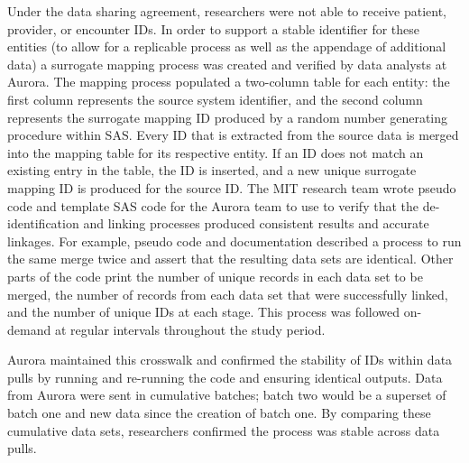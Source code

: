 \documentclass[
]{WileySix}
\begin{document}
Under the data sharing agreement, researchers were not able to receive patient, provider, or encounter IDs. In order to support a stable identifier for these entities (to allow for a replicable process as well as the appendage of additional data) a surrogate mapping process was created and verified by data analysts at Aurora. The mapping process populated a two-column table for each entity: the first column represents the source system identifier, and the second column represents the surrogate mapping ID produced by a random number generating procedure within SAS. Every ID that is extracted from the source data is merged into the mapping table for its respective entity. If an ID does not match an existing entry in the table, the ID is inserted, and a new unique surrogate mapping ID is produced for the source ID. The MIT research team wrote pseudo code and template SAS code for the Aurora team to use to verify that the de-identification and linking processes produced consistent results and accurate linkages. For example, pseudo code and documentation described a process to run the same merge twice and assert that the resulting data sets are identical. Other parts of the code print the number of unique records in each data set to be merged, the number of records from each data set that were successfully linked, and the number of unique IDs at each stage. This process was followed on-demand at regular intervals throughout the study period.

Aurora maintained this crosswalk and confirmed the stability of IDs within data pulls by running and re-running the code and ensuring identical outputs. Data from Aurora were sent in cumulative batches; batch two would be a superset of batch one and new data since the creation of batch one. By comparing these cumulative data sets, researchers confirmed the process was stable across data pulls.
\end{document}
